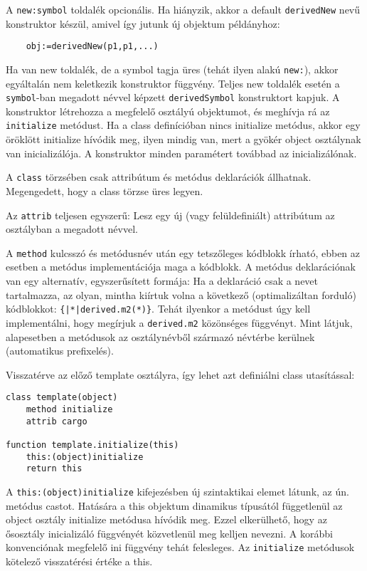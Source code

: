 A \verb!new:symbol! toldalék opcionális. 
Ha hiányzik, akkor a default \verb!derivedNew! 
nevű konstruktor készül, amivel így jutunk új objektum példányhoz:
\begin{verbatim}
    obj:=derivedNew(p1,p1,...)
\end{verbatim}
Ha van new toldalék, de a symbol tagja üres 
(tehát ilyen alakú \verb!new:!), 
akkor egyáltalán nem keletkezik konstruktor függvény. 
Teljes new toldalék esetén a \verb!symbol!-ban megadott 
névvel képzett \verb!derivedSymbol! konstruktort kapjuk.
A konstruktor létrehozza a megfelelő osztályú objektumot, 
és meghívja rá az \verb!initialize! metódust.
Ha a class definícióban nincs initialize metódus, 
akkor egy öröklött initialize hívódik meg, ilyen mindig van, 
mert a gyökér object osztálynak van inicializálója.
A konstruktor minden paramétert továbbad az inicializálónak.


A \verb!class! törzsében csak attribútum és metódus deklarációk
állhatnak. Megengedett, hogy a class törzse üres legyen.

Az \verb!attrib! teljesen egyszerű: Lesz egy új (vagy
felüldefiniált) attribútum az osztályban a megadott névvel.

A \verb!method! kulcsszó és metódusnév után egy tetszőleges kódblokk írható,
ebben az esetben a metódus implementációja maga a kódblokk.
A metódus deklarációnak van egy  alternatív, egyszerűsített formája:
Ha a deklaráció csak a nevet tartalmazza,
az olyan, mintha kiírtuk volna a következő
(optimalizáltan forduló) kódblokkot: \verb!{|*|derived.m2(*)}!. 
Tehát ilyenkor a metódust úgy kell implementálni, 
hogy megírjuk a \verb!derived.m2! közönséges függvényt. 
Mint látjuk, alapesetben a metódusok az osztálynévből származó 
névtérbe kerülnek (automatikus prefixelés).


Visszatérve az előző template osztályra, így lehet azt definiálni
class utasítással:
\begin{verbatim}
class template(object)
    method initialize
    attrib cargo

function template.initialize(this)
    this:(object)initialize
    return this
\end{verbatim}

A \verb!this:(object)initialize! kifejezésben új szintaktikai
elemet látunk, az ún. metódus castot.
Hatására a this objektum dinamikus típusától függetlenül
az object osztály initialize metódusa hívódik meg. Ezzel elkerülhető,
hogy az ősosztály inicializáló függvényét közvetlenül meg kelljen nevezni.
A korábbi konvenciónak megfelelő ini függvény tehát felesleges. 
Az \verb!initialize! metódusok kötelező visszatérési értéke a this.


